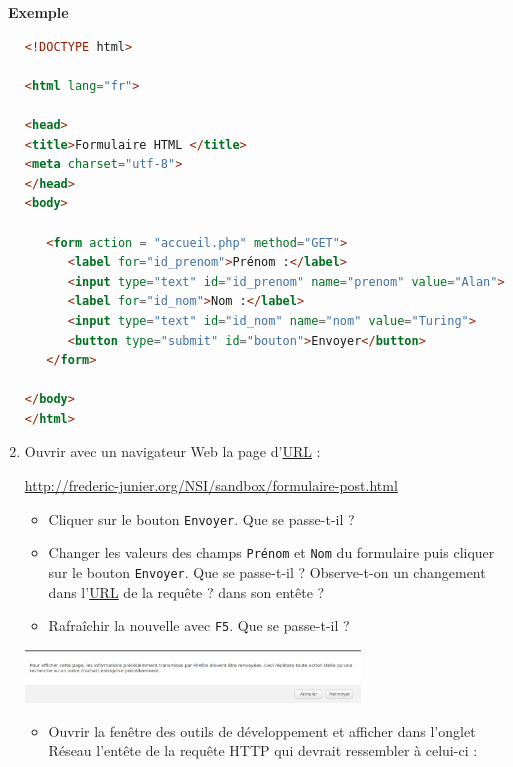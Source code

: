 \documentclass[
  11pt,
]{article}
\newcommand{\passthrough}[1]{#1}
\providecommand{\tightlist}{%
  \setlength{\itemsep}{0pt}\setlength{\parskip}{0pt}}
\newcounter{exple}
\newenvironment{exemple}[1]
{\par \medskip   \addtocounter{exple}{1} \noindent  
\begin{bclogo}[arrondi =0.1,   noborder = true, logo=\bclampe, marge=4]{~\textbf{Exemple} \textbf{\theexple} {\itshape #1} }  \par}
{
\end{bclogo}
 \par \bigskip }
\begin{document}
\begin{exemple}{}
\begin{enumerate}
\begin{lstlisting}[language=HTML]
<!DOCTYPE html>

<html lang="fr">

<head>
<title>Formulaire HTML </title>
<meta charset="utf-8">    
</head> 
<body>

   <form action = "accueil.php" method="GET">        
      <label for="id_prenom">Prénom :</label>
      <input type="text" id="id_prenom" name="prenom" value="Alan">
      <label for="id_nom">Nom :</label>
      <input type="text" id="id_nom" name="nom" value="Turing">
      <button type="submit" id="bouton">Envoyer</button>
   </form>

</body>
</html> 
\end{lstlisting}
\item
  Ouvrir avec un navigateur Web la page
  d'\href{https://developer.mozilla.org/fr/docs/Glossaire/URL}{URL} :

  \url{http://frederic-junier.org/NSI/sandbox/formulaire-post.html}

  \begin{itemize}
  \tightlist
  \item
    Cliquer sur le bouton \passthrough{\lstinline!Envoyer!}. Que se
    passe-t-il ?
  \item
    Changer les valeurs des champs \passthrough{\lstinline!Prénom!} et
    \passthrough{\lstinline!Nom!} du formulaire puis cliquer sur le
    bouton \passthrough{\lstinline!Envoyer!}. Que se passe-t-il ?
    Observe-t-on un changement dans
    l'\href{https://developer.mozilla.org/fr/docs/Glossaire/URL}{URL} de
    la requête ? dans son entête ?
  \item
    Rafraîchir la nouvelle avec \passthrough{\lstinline!F5!}. Que se
    passe-t-il ?
  \end{itemize}

  \includegraphics[width=0.7\textwidth,height=\textheight]{images/avertissement-post.png}\\

  \begin{itemize}
  \tightlist
  \item
    Ouvrir la fenêtre des outils de développement et afficher dans
    l'onglet Réseau l'entête de la requête HTTP qui devrait ressembler à
    celui-ci :
  \end{itemize}


\end{enumerate}
\end{exemple}
\end{document}
